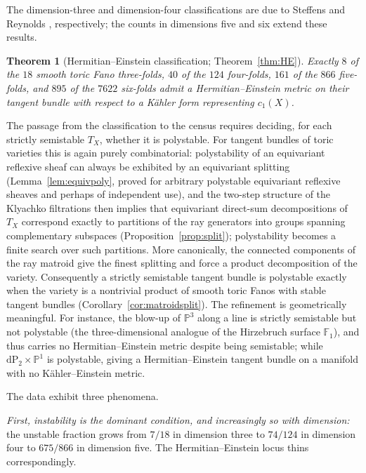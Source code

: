 \documentclass[11pt]{amsart}
\newtheorem{theorem}{Theorem}[section]
\theoremstyle{definition}
\theoremstyle{remark}
\newcommand{\PP}{\mathbb{P}}
\newcommand{\dP}{\mathrm{dP}}
\begin{document}
The dimension-three and dimension-four classifications are due to
Steffens \cite{Steffens1996} and Reynolds \cite[Appendix~A]{Reynolds2023},
respectively; the counts in dimensions five and six extend these results.

\begin{theorem}[Hermitian--Einstein classification; Theorem~\ref{thm:HE}]
Exactly $8$ of the $18$ smooth toric Fano three-folds, $40$ of the $124$
four-folds, $161$ of the $866$ five-folds, and $895$ of the $7622$
six-folds admit a Hermitian--Einstein metric on their tangent bundle
with respect to a K\"ahler form representing $c_1(X)$.
\end{theorem}

The passage from the classification to the census requires deciding, for
each strictly semistable $T_X$, whether it is polystable. For tangent
bundles of toric varieties this is again purely combinatorial:
polystability of an equivariant reflexive sheaf can always be
exhibited by an equivariant splitting (Lemma~\ref{lem:equivpoly}, proved
for arbitrary polystable equivariant reflexive sheaves and perhaps of
independent use), and
the two-step structure of the Klyachko filtrations then implies that
equivariant direct-sum decompositions of $T_X$ correspond exactly to
partitions of the ray generators into groups spanning complementary
subspaces (Proposition~\ref{prop:split}); polystability becomes a finite
search over such partitions. More canonically, the connected components of
the ray matroid give the finest splitting and force a product decomposition of
the variety. Consequently a strictly semistable tangent bundle is polystable
exactly when the variety is a nontrivial product of smooth toric Fanos with
stable tangent bundles (Corollary~\ref{cor:matroidsplit}). The refinement is
geometrically meaningful. For instance, the
blow-up of $\PP^3$ along a line is strictly semistable but not polystable
(the three-dimensional analogue of the Hirzebruch surface
$\mathbb{F}_1$), and thus carries no Hermitian--Einstein metric despite
being semistable; while $\dP_2 \times \PP^1$ is polystable, giving a
Hermitian--Einstein tangent bundle on a manifold with no
K\"ahler--Einstein metric.

The data exhibit three phenomena.

\emph{First, instability is the dominant condition, and increasingly so
with dimension:} the unstable fraction grows from $7/18$ in dimension
three to $74/124$ in dimension four to $675/866$ in dimension five. The
Hermitian--Einstein locus thins correspondingly.
\end{document}
